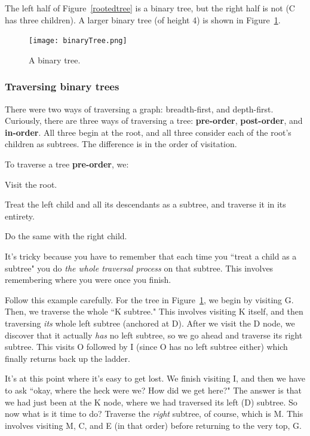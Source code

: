The left half of Figure~\ref{rootedtree} is a binary tree, but the right
half is not (C has three children). A larger binary tree (of height 4) is
shown in Figure~\ref{binarytree}.

\begin{figure}[ht]
\centering
\texttt{[image: binaryTree.png]}
\caption{A binary tree.}
\label{binarytree}
\end{figure}

\subsubsection{Traversing binary trees}

There were two ways of traversing a graph: breadth-first, and depth-first.
Curiously, there are three ways of traversing a tree: \textbf{pre-order},
\textbf{post-order}, and \textbf{in-order}. All three begin at the root,
and all three consider each of the root's children as subtrees. The
difference is in the order of visitation.


\begin{framed}
To traverse a tree \textbf{pre-order}, we:
\begin{compactenum}
\item Visit the root.
\item Treat the left child and all its descendants as a subtree, and
traverse it in its entirety.
\item Do the same with the right child.
\end{compactenum}
\end{framed}

It's tricky because you have to remember that each time you ``treat a child
as a subtree" you do \textit{the whole traversal process} on that subtree.
This involves remembering where you were once you finish.

Follow this example carefully. For the tree in Figure~\ref{binarytree}, we
begin by visiting G. Then, we traverse the whole ``K subtree." This
involves visiting K itself, and then traversing \textit{its} whole left
subtree (anchored at D). After we visit the D node, we discover that it
actually \textit{has} no left subtree, so we go ahead and traverse its
right subtree. This visits O followed by I (since O has no left subtree
either) which finally returns back up the ladder.

It's at this point where it's easy to get lost. We finish visiting I, and
then we have to ask ``okay, where the heck were we? How did we get here?"
The answer is that we had just been at the K node, where we had traversed
its left (D) subtree. So now what is it time to do? Traverse the
\textit{right} subtree, of course, which is M. This involves visiting M, C,
and E (in that order) before returning to the very top, G. 

